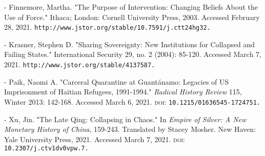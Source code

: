 \documentclass[letterpaper,12pt,twoside]{article}
\begin{document}
\pagebreak

\begin{thebibliography}{99\kern\bibindent}
  \makeatletter
    \let\old@biblabel\@biblabel
    \def\@biblabel#1{
      \old@biblabel{#1}\kern\bibindent
    }
    \let\old@bibitem\bibitem
    \def\bibitem#1{
      \old@bibitem{#1}\leavevmode\kern-\bibindent
    }
    \renewcommand\@biblabel[1]{}
    \makeatother

  \raggedright
  

     Finnemore, Martha. "The Purpose of Intervention: Changing Beliefs About the Use of Force." Ithaca; London: Cornell University Press, 2003. Accessed February 28, 2021. \texttt{http://www.jstor.org/stable/10.7591/j.ctt24hg32.}

     Krasner, Stephen D. "Sharing Sovereignty: New Institutions for Collapsed and Failing States." International Security 29, no. 2 (2004): 85-120. Accessed March 7, 2021. \texttt{http://www.jstor.org/stable/4137587.}

     Paik, Naomi A. "Carceral Quarantine at Guantánamo: Legacies of US Imprisonment of Haitian Refugees, 1991-1994." \textit{Radical History Review} 115, Winter 2013: 142-168. Accessed March 6, 2021. \textsc{doi:} \texttt{10.1215/01636545-1724751.}

     Xu, Jin. "The Late Qing: Collapsing in Chaos." In \textit{Empire of Silver: A New Monetary History of China}, 159-243. Translated by Stacey Mosher. New Haven: Yale University Press, 2021. Accessed March 7, 2021. \textsc{doi:} \texttt{10.2307/j.ctv1dv0vpw.7.}

\end{thebibliography}
\end{document}
